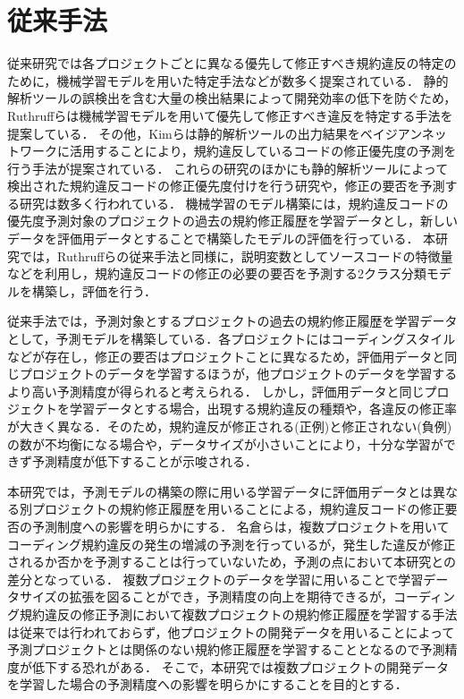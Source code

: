 \documentclass[11pt,dvipdfmx]{jreport}
\begin{document}
\section{従来手法}

従来研究では各プロジェクトごとに異なる優先して修正すべき規約違反の特定のために，機械学習モデルを用いた特定手法などが数多く提案されている．
静的解析ツールの誤検出を含む大量の検出結果によって開発効率の低下を防ぐため，Ruthruffらは機械学習モデルを用いて優先して修正すべき違反を特定する手法を提案している\cite{JyuraiPre}．
その他，Kimらは静的解析ツールの出力結果をベイジアンネットワークに活用することにより，規約違反しているコードの修正優先度の予測を行う手法が提案されている\cite{beizu}．
これらの研究のほかにも静的解析ツールによって検出された規約違反コードの修正優先度付けを行う研究や，修正の要否を予測する研究は数多く行われている\cite{Wang}\cite{Qing}\cite{HowFar}．
機械学習のモデル構築には，規約違反コードの優先度予測対象のプロジェクトの過去の規約修正履歴を学習データとし，新しいデータを評価用データとすることで構築したモデルの評価を行っている．
本研究では，Ruthruffらの従来手法と同様に，説明変数としてソースコードの特徴量などを利用し，規約違反コードの修正の必要の要否を予測する2クラス分類モデルを構築し，評価を行う．

従来手法では，予測対象とするプロジェクトの過去の規約修正履歴を学習データとして，予測モデルを構築している．各プロジェクトにはコーディングスタイルなどが存在し，修正の要否はプロジェクトことに異なるため，評価用データと同じプロジェクトのデータを学習するほうが，他プロジェクトのデータを学習するより高い予測精度が得られると考えられる．
しかし，評価用データと同じプロジェクトを学習データとする場合，出現する規約違反の種類や，各違反の修正率が大きく異なる\cite{Panichella}．そのため，規約違反が修正される(正例)と修正されない(負例)の数が不均衡になる場合や，データサイズが小さいことにより，十分な学習ができず予測精度が低下することが示唆される．

本研究では，予測モデルの構築の際に用いる学習データに評価用データとは異なる別プロジェクトの規約修正履歴を用いることによる，規約違反コードの修正要否の予測制度への影響を明らかにする．
名倉らは，複数プロジェクトを用いてコーディング規約違反の発生の増減の予測を行っているが，発生した違反が修正されるか否かを予測することは行っていないため，予測の点において本研究との差分となっている\cite{nagura}．
複数プロジェクトのデータを学習に用いることで学習データサイズの拡張を図ることができ，予測精度の向上を期待できるが，コーディング規約違反の修正予測において複数プロジェクトの規約修正履歴を学習する手法は従来では行われておらず，他プロジェクトの開発データを用いることによって予測プロジェクトとは関係のない規約修正履歴を学習することとなるので予測精度が低下する恐れがある．
そこで，本研究では複数プロジェクトの開発データを学習した場合の予測精度への影響を明らかにすることを目的とする．
\end{document}
